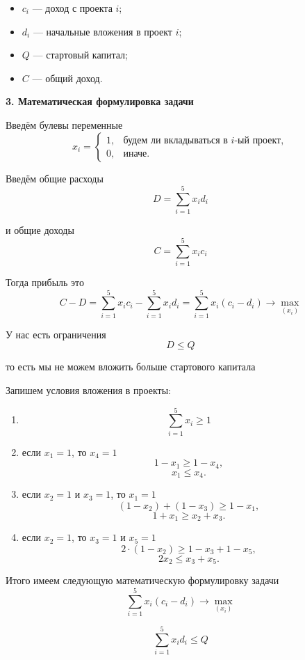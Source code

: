 \begin{itemize}
	\item $c_i$ --- доход с проекта $i$;
	
	\item $d_i$ --- начальные вложения в проект $i$;
	
	\item $Q$ --- стартовый капитал;
	
	\item $C$ --- общий доход.
\end{itemize}

\textbf{3. Математическая формулировка задачи}

Введём булевы переменные
\[
	x_i = \begin{cases}
		1, & \text{будем ли вкладываться в $i$-ый проект}, \\
		0, & \text{иначе}.
	\end{cases}
\]

Введём общие расходы
\[
	D = \sum_{i=1}^5 x_i d_i
\]

и общие доходы
\[
	C = \sum_{i=1}^5 x_i c_i
\]

Тогда прибыль это
\[
	C - D = \sum_{i=1}^5 x_i c_i - \sum_{i=1}^5 x_i d_i = \sum_{i=1}^5 x_i (c_i - d_i) \to \max_{(x_i)}
\]

У нас есть ограничения
\[
	D \le Q
\]

то есть мы не можем вложить больше стартового капитала

Запишем условия вложения в проекты:
\begin{enumerate}
	\item 
	
	\[
		\sum_{i=1}^{5} x_i \ge 1
	\]
	
	\item если $x_1 = 1$, то $x_4 = 1$
	\[
		1 - x_1 \ge 1 - x_4,
	\]
	\[
		x_1 \le x_4.	
	\]
	
	\item если $x_2 = 1$ и $x_3 = 1$, то $x_1 = 1$
	\[
		(1 - x_2) + (1 - x_3) \ge 1 - x_1,
	\]
	\[
		1 + x_1 \ge x_2 + x_3.
	\]
	
	\item если $x_2 = 1$, то $x_3 = 1$ и $x_5 = 1$
	\[
		2 \cdot (1 - x_2) \ge 1 - x_3 + 1 - x_5,
	\]
	\[
		2x_2 \le x_3 + x_5.
	\]
\end{enumerate}

Итого имеем следующую математическую формулировку задачи
\[
	\sum_{i=1}^5 x_i (c_i - d_i) \to \max_{(x_i)}
\]

\[
	 \sum_{i=1}^5 x_i d_i \le Q
\]

